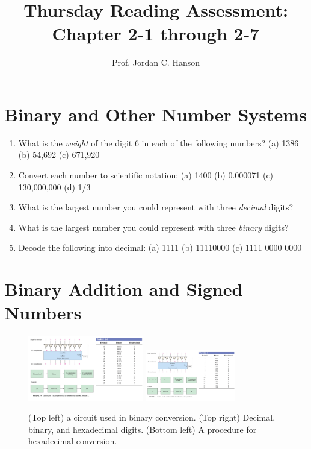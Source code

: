 \documentclass{article}
\begin{document}
\title{Thursday Reading Assessment: Chapter 2-1 through 2-7}
\author{Prof. Jordan C. Hanson}

\maketitle

\section{Binary and Other Number Systems}

\begin{enumerate}
\item What is the \textit{weight} of the digit 6 in each of the following numbers? (a) 1386 (b) 54,692 (c) 671,920 \\ \vspace{0.2cm}
\item Convert each number to scientific notation: (a) 1400 (b) 0.000071 (c) 130,000,000 (d) 1/3 \\ \vspace{0.2cm}
\item What is the largest number you could represent with three \textit{decimal} digits?
\item What is the largest number you could represent with three \textit{binary} digits?
\item Decode the following into decimal: (a) 1111 (b) 11110000 (c) 1111 0000 0000 \\ \vspace{0.2cm}
\end{enumerate}

\section{Binary Addition and Signed Numbers}

\begin{figure}[hb]
\centering
\includegraphics[width=0.45\textwidth,trim=0cm 8cm 12cm 0cm,clip=true]{figures/quiz_graphic.pdf} \hspace{0.25cm}
\includegraphics[width=0.35\textwidth,trim=16cm 7cm 0cm 0cm,clip=true]{figures/quiz_graphic.pdf}
\caption{\label{fig:quiz}(Top left) a circuit used in binary conversion. (Top right) Decimal, binary, and hexadecimal digits. (Bottom left) A procedure for hexadecimal conversion.}
\end{figure}
\end{document}
